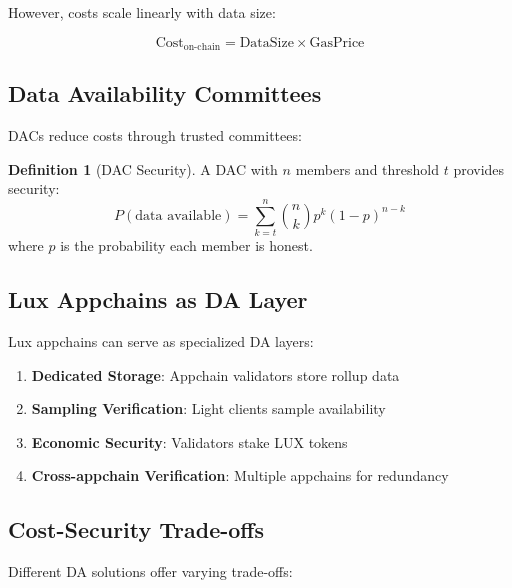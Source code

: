 \documentclass[11pt,a4paper]{article}
\theoremstyle{definition}
\newtheorem{definition}{Definition}[section]
\begin{document}
However, costs scale linearly with data size:

\begin{equation}
\text{Cost}_{\text{on-chain}} = \text{DataSize} \times \text{GasPrice}
\end{equation}

\subsection{Data Availability Committees}

DACs reduce costs through trusted committees:

\begin{definition}[DAC Security]
A DAC with $n$ members and threshold $t$ provides security:
\begin{equation}
P(\text{data available}) = \sum_{k=t}^{n} \binom{n}{k} p^k (1-p)^{n-k}
\end{equation}
where $p$ is the probability each member is honest.
\end{definition}

\subsection{Lux Appchains as DA Layer}

Lux appchains can serve as specialized DA layers:

\begin{enumerate}
    \item \textbf{Dedicated Storage}: Appchain validators store rollup data
    \item \textbf{Sampling Verification}: Light clients sample availability
    \item \textbf{Economic Security}: Validators stake LUX tokens
    \item \textbf{Cross-appchain Verification}: Multiple appchains for redundancy
\end{enumerate}

\subsection{Cost-Security Trade-offs}

Different DA solutions offer varying trade-offs:
\end{document}
